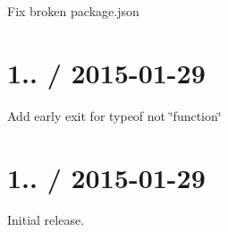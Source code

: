 \begin{DoxyItemize}
\item Fix broken package.\+json
\end{DoxyItemize}

\section*{1.. / 2015-\/01-\/29 }


\begin{DoxyItemize}
\item Add early exit for typeof not \char`\"{}function\char`\"{}
\end{DoxyItemize}

\section*{1.. / 2015-\/01-\/29 }


\begin{DoxyItemize}
\item Initial release. 
\end{DoxyItemize}
